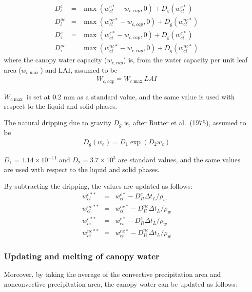 \begin{eqnarray}
 D_l^c     &=&  \max( w_{cl}^{c*} - w_{c,cap}, 0 ) + D_{g}(w_{cl}^{c*}) \\
 D_l^{nc}  &=&  \max( w_{cl}^{nc*}- w_{c,cap}, 0 ) + D_{g}(w_{cl}^{nc*}) \\
 D_i^c     &=&  \max( w_{ci}^{c*} - w_{c,cap}, 0 ) + D_{g}(w_{ci}^{c*}) \\
 D_i^{nc}  &=&  \max( w_{ci}^{nc*}- w_{c,cap}, 0 ) + D_{g}(w_{ci}^{nc*})
\end{eqnarray} where the canopy water capacity (\(w_{c,cap}\)) is, from the water capacity per unit leaf area (\(w_{c\max}\)) and LAI, assumed to be \begin{eqnarray}
 W_{c,cap} = W_{c\max} LAI
\end{eqnarray}

\(W_{c\max}\) is set at 0.2 mm as a standard value, and the same value is used with respect to the liquid and solid phases.

The natural dripping due to gravity \(D_g\) is, after Rutter et al.~(1975), assumed to be \begin{eqnarray}
 D_g(w_c) = D_1 \exp(D_2 w_c)
\end{eqnarray}

\(D_1=1.14 \times 10 ^{-11}\) and \(D_2=3.7 \times 10^{3}\) are standard values, and the same values are used with respect to the liquid and solid phases.

By subtracting the dripping, the values are updated as follows: \begin{eqnarray}
 w_{cl}^{c**} &=& w_{cl}^{c*}  - D_{Il}^c    \Delta t_L / \rho_w \\
 w_{cl}^{nc**}&=& w_{cl}^{nc*} - D_{Il}^{nc} \Delta t_L / \rho_w \\
 w_{ci}^{c**} &=& w_{ci}^{c*}  - D_{Ii}^c    \Delta t_L / \rho_w \\
 w_{ci}^{nc**}&=& w_{ci}^{nc*} - D_{Ii}^{nc} \Delta t_L / \rho_w
\end{eqnarray}

\hypertarget{updating-and-melting-of-canopy-water}{%
\subsubsection{Updating and melting of canopy water}\label{updating-and-melting-of-canopy-water}}

Moreover, by taking the average of the convective precipitation area and nonconvective precipitation area, the canopy water can be updated as follows:

